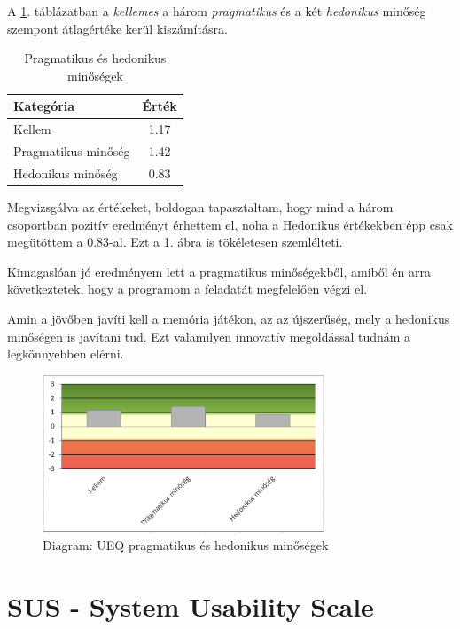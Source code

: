 A \ref{tab:pragmatic_hedonic_quality}. táblázatban a \textit{kellemes} a három \textit{pragmatikus} és a két \textit{hedonikus} minőség szempont átlagértéke kerül kiszámításra. 

\begin{table}[h]
    \centering
    \caption{Pragmatikus és hedonikus minőségek}
    \begin{tabular}{|l|c|}
        \hline
        \textbf{Kategória} & \textbf{Érték} \\ \hline
        Kellem & 1.17 \\ \hline
        Pragmatikus minőség & 1.42 \\ \hline
        Hedonikus minőség & 0.83 \\ \hline
    \end{tabular}
    \label{tab:pragmatic_hedonic_quality}
\end{table}

Megvizsgálva az értékeket, boldogan tapasztaltam, hogy mind a három csoportban pozitív eredményt érhettem el, noha a Hedonikus értékekben épp csak megütöttem a 0.83-al. Ezt a \ref{diag:pragmatic_hedonic}. ábra is tökéletesen szemlélteti. 

Kimagaslóan jó eredményem lett a pragmatikus minőségekből, amiből én arra következtetek, hogy a programom a feladatát megfelelően végzi el. 

Amin a jövőben javíti kell a memória játékon, az az újszerűség, mely a hedonikus minőségen is javítani tud. Ezt valamilyen innovatív megoldással tudnám a legkönnyebben elérni. 

\begin{figure}[h]
    \center
    \includegraphics[width=0.75\textwidth]{img/UEQ_pragmatic_hedonic.png}
    \caption{Diagram: UEQ pragmatikus és hedonikus minőségek}
    \label{diag:pragmatic_hedonic}
\end{figure}

\section{SUS - System Usability Scale}

